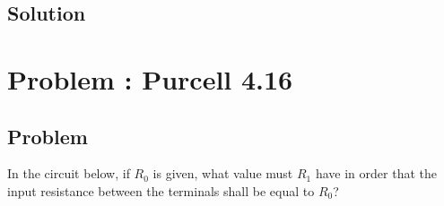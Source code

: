 \documentclass[solutions]{esg8022pset}
\begin{document}
\subsection{Solution}

\section{Problem \thesection: Purcell 4.16}
\subsection{Problem}
  In the circuit below, if $R_0$ is given, what value must $R_1$ have in order
  that the input resistance between the terminals shall be equal to $R_0$?
\end{document}
